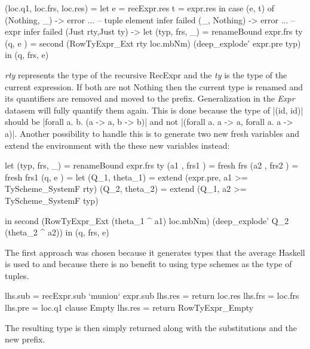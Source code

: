\begin{code}    
   (loc.q1, loc.frs, loc.res)
     =  let  e  = recExpr.res
             t  = expr.res
        in case (e, t) of
             (Nothing, _) -> error ... -- tuple element infer failed
             (_, Nothing) -> error ... -- expr infer failed
             (Just rty,Just ty) -> 
                let  (typ, frs,  _)  = renameBound expr.frs ty 
                     (q,   e      )  = second  (RowTyExpr_Ext rty loc.mbNm) 
                                               (deep_explode' expr.pre typ)
                in (q, frs, e)
\end{code}
\emph{rty} represents the type of the recursive RecExpr and the \emph{ty} is the type of the current expression. If both are not Nothing then the current type is renamed and its quantifiers are removed and moved to the prefix. Generalization in the \emph{Expr} datasem will fully quantify them again. This is done because the type of |(id, id)| should be |forall a. b. (a -> a, b -> b)| and not |(forall a. a -> a, forall a. a -> a)|. Another possibility to handle this is to generate two new fresh variables and extend the environment with the these new variables instead:

\begin{code}
                let  (typ, frs,  _)  = renameBound expr.frs ty 
                     (a1 , frs1   )  = fresh frs
                     (a2 , frs2   )  = fresh frs1
                     (q,   e      )  = let (Q_1, theta_1) = extend (expr.pre, a1 >= TyScheme_SystemF rty)
                                           (Q_2, theta_2) = extend (Q_1, a2 >= TyScheme_SystemF typ)

                                       in second  (RowTyExpr_Ext (theta_1 ^ a1) loc.mbNm) 
                                                  (deep_explode' Q_2 (theta_2 ^ a2))
                in (q, frs, e)
\end{code}
The first approach was chosen because it generates types that the average Haskell is used to and because there is no benefit to using type schemes as the type of tuples.

\begin{code}                              
      lhs.sub  = recExpr.sub `munion` expr.sub
      lhs.res  = return loc.res
      lhs.frs  = loc.frs
      lhs.pre  = loc.q1
   clause Empty
      lhs.res  = return RowTyExpr_Empty
\end{code}
The resulting type is then simply returned along with the substitutions and the new prefix. 

